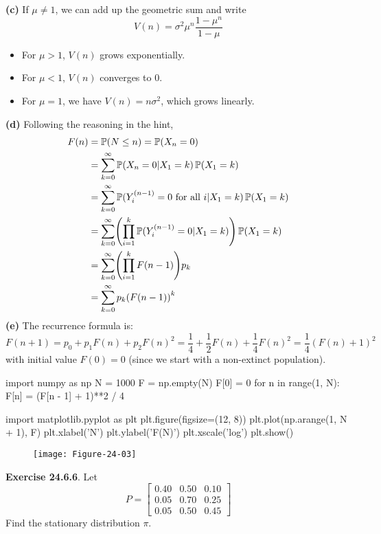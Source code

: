 \textbf{(c)} If \(\mu \neq 1\), we can add up the geometric sum and
write
\[
V(n) = \sigma^{2} \mu^{n} \frac{1 - \mu^{n}}{1 - \mu}
\]
\begin{itemize}[tightlist]
\item
  For \(\mu > 1\), \(V(n)\) grows exponentially.\\
\item
  For \(\mu < 1\), \(V(n)\) converges to 0.\\
\item
  For \(\mu = 1\), we have \(V(n) = n \sigma^{2}\), which grows linearly.
\end{itemize}
\textbf{(d)} Following the reasoning in the hint,
\begin{align*}
F(n) &= \PROB(N \leq n) = \PROB(X_{n} = 0) \\
&= \sum_{k=0}^{\infty} \PROB(X_{n} = 0 | X_{1} = k) \PROB(X_{1} = k) \\
&= \sum_{k=0}^{\infty} \PROB(Y_{i}^{(n - 1)} = 0 \text{ for all } i | X_{1} = k) \PROB(X_{1} = k) \\
&= \sum_{k=0}^{\infty} \left( \prod_{i=1}^{k} \PROB(Y_{i}^{(n - 1)} = 0 | X_{1} = k) \right) \PROB(X_{1} = k) \\
&= \sum_{k=0}^{\infty} \left( \prod_{i=1}^{k} F(n-1) \right) p_{k} \\
&= \sum_{k=0}^{\infty} p_{k} \left( F(n - 1)\right)^{k}
\end{align*}
\textbf{(e)} The recurrence formula is:
\[
F(n + 1) = p_{0} + p_{1} F(n) + p_{2} F(n)^{2} = \frac{1}{4} + \frac{1}{2} F(n) + \frac{1}{4} F(n)^{2} = \frac{1}{4} (F(n) + 1)^{2}
\]
with initial value \(F(0) = 0\) (since we start with a non-extinct
population).

\begin{python}
import numpy as np
N = 1000
F = np.empty(N)
F[0] = 0
for n in range(1, N):
    F[n] = (F[n - 1] + 1)**2 / 4
\end{python}

\begin{python}
import matplotlib.pyplot as plt
plt.figure(figsize=(12, 8))
plt.plot(np.arange(1, N + 1), F)
plt.xlabel('N')
plt.ylabel('F(N)')
plt.xscale('log')
plt.show()
\end{python}

\begin{figure}[H]
\centering
\texttt{[image: Figure-24-03]}
\end{figure}


\textbf{Exercise 24.6.6}. Let
\[
P = \begin{bmatrix}
0.40 & 0.50 & 0.10 \\
0.05 & 0.70 & 0.25 \\
0.05 & 0.50 & 0.45
\end{bmatrix}
\]
Find the stationary distribution \(\pi\).

